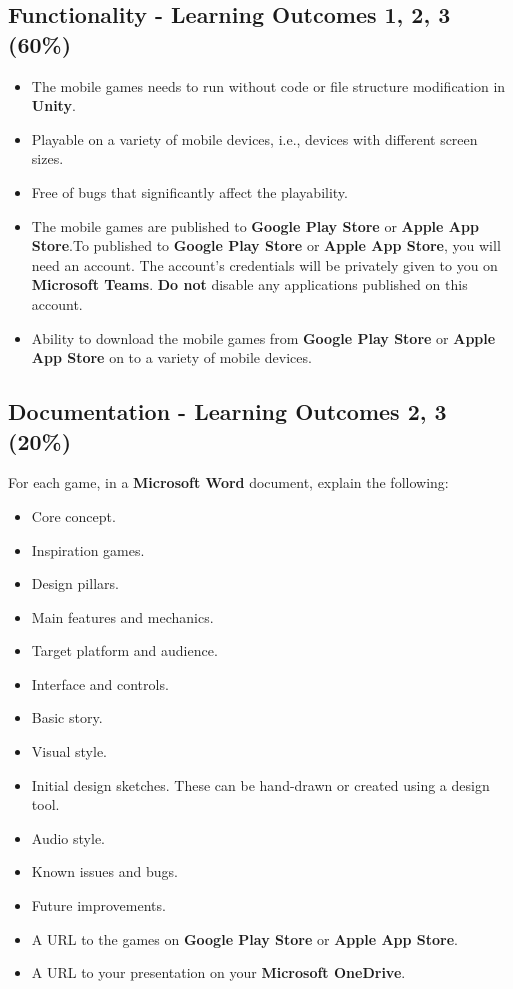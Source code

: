 \documentclass{article}
\begin{document}
\subsection*{Functionality - Learning Outcomes 1, 2, 3 (60\%)}
\begin{itemize}
	\item The mobile games needs to run without code or file structure modification in \textbf{Unity}.
	\item Playable on a variety of mobile devices, i.e., devices with different screen sizes.
	\item Free of bugs that significantly affect the playability.
	\item The mobile games are published to \textbf{Google Play Store} or \textbf{Apple App Store}.To published to \textbf{Google Play Store} or \textbf{Apple App Store}, you will need an account. The account's credentials will be privately given to you on \textbf{Microsoft Teams}. \textbf{Do not} disable any applications published on this account.
	\item Ability to download the mobile games from \textbf{Google Play Store} or \textbf{Apple App Store} on to a variety of mobile devices.
\end{itemize}

\subsection*{Documentation - Learning Outcomes 2, 3 (20\%)}
For each game, in a \textbf{Microsoft Word} document, explain the following:
\begin{itemize}
	\item Core concept.
	\item Inspiration games.
	\item Design pillars.
	\item Main features and mechanics.
	\item Target platform and audience.
	\item Interface and controls.
	\item Basic story.
	\item Visual style.
	\item Initial design sketches. These can be hand-drawn or created using a design tool.
	\item Audio style.
	\item Known issues and bugs.
	\item Future improvements.
	\item A URL to the games on \textbf{Google Play Store} or \textbf{Apple App Store}.
	\item A URL to your presentation on your \textbf{Microsoft OneDrive}.
\end{itemize}
\end{document}
